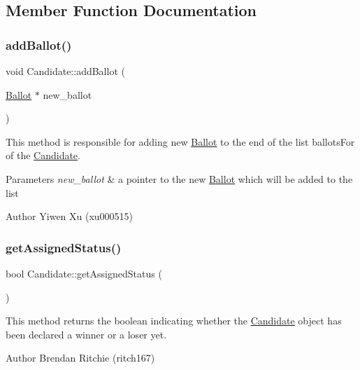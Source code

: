 \subsection{Member Function Documentation}
\mbox{\label{classCandidate_abbe882aa5bad2f1b769c3df933495703}} 
\subsubsection{\texorpdfstring{add\+Ballot()}{addBallot()}}
{\footnotesize\ttfamily void Candidate\+::add\+Ballot (\begin{DoxyParamCaption}\item[{\hyperlink{classBallot}{Ballot} $\ast$}]{new\+\_\+ballot }\end{DoxyParamCaption})}

This method is responsible for adding new \hyperlink{classBallot}{Ballot} to the end of the list ballots\+For of the \hyperlink{classCandidate}{Candidate}. 
\begin{DoxyParams}{Parameters}
{\em new\+\_\+ballot} & a pointer to the new \hyperlink{classBallot}{Ballot} which will be added to the list \\
\hline
\end{DoxyParams}
\begin{DoxyAuthor}{Author}
Yiwen Xu (xu000515) 
\end{DoxyAuthor}
\mbox{\label{classCandidate_ac00fcb7914f89cca8bb02ed2e6d6f4e4}} 
\subsubsection{\texorpdfstring{get\+Assigned\+Status()}{getAssignedStatus()}}
{\footnotesize\ttfamily bool Candidate\+::get\+Assigned\+Status (\begin{DoxyParamCaption}{ }\end{DoxyParamCaption})}

This method returns the boolean indicating whether the \hyperlink{classCandidate}{Candidate} object has been declared a winner or a loser yet. \begin{DoxyAuthor}{Author}
Brendan Ritchie (ritch167) 
\end{DoxyAuthor}
\mbox{\label{classCandidate_a2bd33d32107aa062ef8bd82e8b2ee7e9}} 
